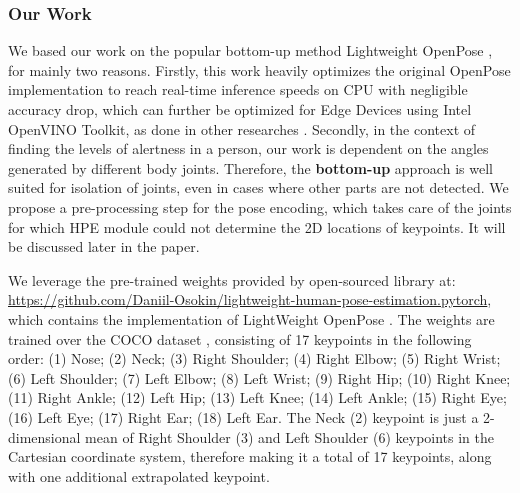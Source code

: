 \documentclass[sigconf]{acmart}
\begin{document}
\subsubsection{Our Work}
We based our work on the popular bottom-up method Lightweight OpenPose \cite{osokin2018lightweight_openpose}, for mainly two reasons. Firstly, this work heavily optimizes the original OpenPose \cite{8765346} implementation to reach real-time inference speeds on CPU with negligible accuracy drop, which can further be optimized for Edge Devices using Intel\textregistered{} OpenVINO\texttrademark{} Toolkit, as done in other researches \cite{intel_openvino}. Secondly, in the context of finding the levels of alertness in a person, our work is dependent on the angles generated by different body joints. Therefore, the \textbf{bottom-up} approach is well suited for isolation of joints, even in cases where other parts are not detected. We propose a pre-processing step for the pose encoding, which takes care of the joints for which HPE module could not determine the 2D locations of keypoints. It will be discussed later in the paper.

We leverage the pre-trained weights provided by open-sourced library at: \href{https://github.com/Daniil-Osokin/lightweight-human-pose-estimation.pytorch}{https://github.com/Daniil-Osokin/lightweight-human-pose-estimation.pytorch}, which contains the implementation of LightWeight OpenPose \cite{osokin2018lightweight_openpose}. The weights are trained over the COCO dataset \cite{10.1007/978-3-319-10602-1_48}, consisting of 17 keypoints in the following order: (1) Nose; (2) Neck; (3) Right Shoulder; (4) Right Elbow; (5) Right Wrist; (6) Left Shoulder; (7) Left Elbow; (8) Left Wrist; (9) Right Hip; (10) Right Knee; (11) Right Ankle; (12) Left Hip; (13) Left Knee; (14) Left Ankle; (15) Right Eye; (16) Left Eye; (17) Right Ear; (18) Left Ear. The Neck (2) keypoint is just a 2-dimensional mean of Right Shoulder (3) and Left Shoulder (6) keypoints in the Cartesian coordinate system, therefore making it a total of 17 keypoints, along with one additional extrapolated keypoint.
\end{document}
